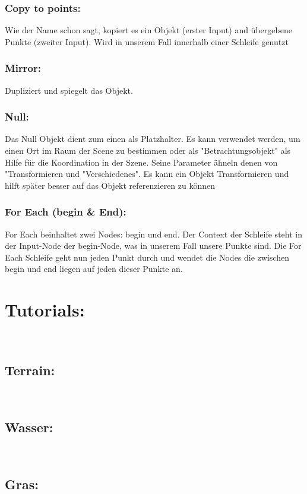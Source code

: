 \begin{​itemize}
\subsubsection*{​Copy to points:}
Wie der Name schon sagt, kopiert es ein Objekt (erster Input) and übergebene Punkte (zweiter Input). Wird in unserem Fall innerhalb einer Schleife genutzt

\subsubsection*{​Mirror:}
Dupliziert und spiegelt das Objekt. 

\subsubsection*{​Null:}
Das Null Objekt dient zum einen als Platzhalter. Es kann verwendet werden, um einen Ort im Raum der Scene zu bestimmen oder als "Betrachtungsobjekt" als Hilfe für die Koordination in der Szene. Seine Parameter ähneln denen von "Transformieren und "Verschiedenes". Es kann ein Objekt Transformieren und hilft später besser auf das Objekt referenzieren zu können

\subsubsection*{​For Each (begin & End):}
For Each beinhaltet zwei Nodes: begin und end. Der Context der Schleife steht in der Input-Node der begin-Node, was in unserem Fall unsere Punkte sind. Die For Each Schleife geht nun jeden Punkt durch und wendet die Nodes die zwischen begin und end liegen auf jeden dieser Punkte an.


\section*{​\textcolor{​rosa}​{​Tutorials:}​}​
\subsection*{​Terrain:}​
\subsection*{​Wasser:}​
\subsection*{​Gras:}​




\end{​itemize}
